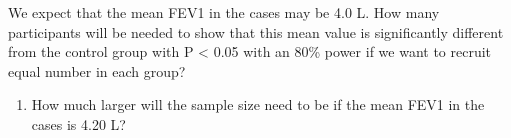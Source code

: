 \documentclass[
]{memoir}
\providecommand{\tightlist}{%
  \setlength{\itemsep}{0pt}\setlength{\parskip}{0pt}}
\begin{document}
We expect that the mean FEV1 in the cases may be 4.0 L.
How many participants will be needed to show that this mean value is significantly different from the control group with P \textless{} 0.05 with an 80\% power if we want to recruit equal number in each group?

\begin{enumerate}
\def\labelenumi{\alph{enumi})}
\setcounter{enumi}{2}
\tightlist
\item
  How much larger will the sample size need to be if the mean FEV1 in the cases is 4.20 L?
\end{enumerate}

  
\end{document}

